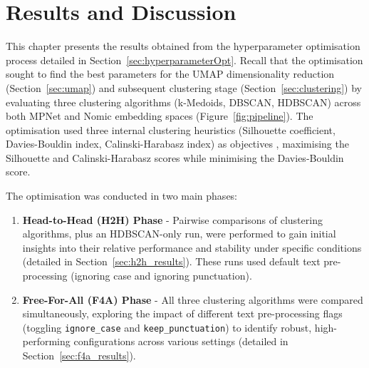 \documentclass[10pt,oneside]{report}
\begin{document}
%
%
%

\chapter{Results and Discussion}\label{chap:results}

This chapter presents the results obtained from the hyperparameter optimisation process detailed in Section~\ref{sec:hyperparameterOpt}. Recall that the optimisation sought to find the best parameters for the UMAP dimensionality reduction (Section~\ref{sec:umap}) and subsequent clustering stage (Section~\ref{sec:clustering}) by evaluating three clustering algorithms (k-Medoids, DBSCAN, HDBSCAN) across both MPNet and Nomic embedding spaces (Figure~\ref{fig:pipeline}). The optimisation used three internal clustering heuristics (Silhouette coefficient, Davies-Bouldin index, Calinski-Harabasz index) as objectives \cite{rousseeuw1987silhouettes, davies1979cluster, calinski1974dendrite}, maximising the Silhouette and Calinski-Harabasz scores while minimising the Davies-Bouldin score. 

The optimisation was conducted in two main phases:
\begin{enumerate}
    \item \textbf{Head-to-Head (H2H) Phase} - Pairwise comparisons of clustering algorithms, plus an HDBSCAN-only run, were performed to gain initial insights into their relative performance and stability under specific conditions (detailed in Section~\ref{sec:h2h_results}). These runs used default text pre-processing (ignoring case and ignoring punctuation).
    \item \textbf{Free-For-All (F4A) Phase} - All three clustering algorithms were compared simultaneously, exploring the impact of different text pre-processing flags (toggling \texttt{ignore\_case} and \texttt{keep\_punctuation}) to identify robust, high-performing configurations across various settings (detailed in Section~\ref{sec:f4a_results}).
\end{enumerate}
\end{document}
